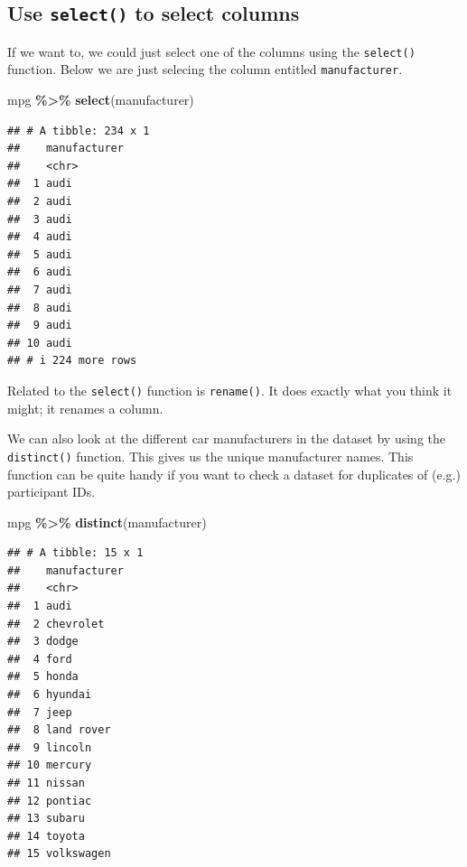\documentclass[
]{book}
\newenvironment{Shaded}{\begin{snugshade}}{\end{snugshade}}
\newcommand{\FunctionTok}[1]{\textcolor[rgb]{0.13,0.29,0.53}{\textbf{#1}}}
\newcommand{\NormalTok}[1]{#1}
\newcommand{\SpecialCharTok}[1]{\textcolor[rgb]{0.81,0.36,0.00}{\textbf{#1}}}
\begin{document}
\hypertarget{use-select-to-select-columns}{%
\subsection{\texorpdfstring{Use \texttt{select()} to select columns}{Use select() to select columns}}\label{use-select-to-select-columns}}

If we want to, we could just select one of the columns using the \texttt{select()} function. Below we are just selecing the column entitled \texttt{manufacturer}.

\begin{Shaded}
\begin{Highlighting}[]
\NormalTok{mpg }\SpecialCharTok{\%\textgreater{}\%}
  \FunctionTok{select}\NormalTok{(manufacturer)}
\end{Highlighting}
\end{Shaded}

\begin{verbatim}
## # A tibble: 234 x 1
##    manufacturer
##    <chr>       
##  1 audi        
##  2 audi        
##  3 audi        
##  4 audi        
##  5 audi        
##  6 audi        
##  7 audi        
##  8 audi        
##  9 audi        
## 10 audi        
## # i 224 more rows
\end{verbatim}

Related to the \texttt{select()} function is \texttt{rename()}. It does exactly what you think it might; it renames a column.

We can also look at the different car manufacturers in the dataset by using the \texttt{distinct()} function. This gives us the unique manufacturer names. This function can be quite handy if you want to check a dataset for duplicates of (e.g.) participant IDs.

\begin{Shaded}
\begin{Highlighting}[]
\NormalTok{mpg }\SpecialCharTok{\%\textgreater{}\%}
  \FunctionTok{distinct}\NormalTok{(manufacturer)}
\end{Highlighting}
\end{Shaded}

\begin{verbatim}
## # A tibble: 15 x 1
##    manufacturer
##    <chr>       
##  1 audi        
##  2 chevrolet   
##  3 dodge       
##  4 ford        
##  5 honda       
##  6 hyundai     
##  7 jeep        
##  8 land rover  
##  9 lincoln     
## 10 mercury     
## 11 nissan      
## 12 pontiac     
## 13 subaru      
## 14 toyota      
## 15 volkswagen
\end{verbatim}
\end{document}
